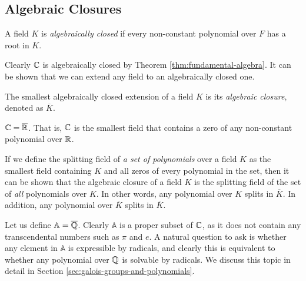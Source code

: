 \subsection{Algebraic Closures}
\begin{definition}
	A field $K$ is \textit{algebraically closed} if every non-constant polynomial over $F$ has a root in $K$. 
\end{definition}

Clearly $\mathbb C$ is algebraically closed by Theorem \ref{thm:fundamental-algebra}. It can be shown that we can extend any field to an algebraically closed one. 

\begin{definition}
	The smallest algebraically closed extension of a field $K$ is its \textit{algebraic closure}, denoted as $\overline K$.
\end{definition}

\begin{example}
	$\mathbb C  = \overline {\mathbb R}$. That is, $\mathbb C$ is the smallest field that contains a zero of any non-constant polynomial over $\mathbb R$.
\end{example}


If we define the splitting field of \textit{a set of polynomials} over a field $K$ as the smallest field containing $K$ and all zeros of every polynomial in the set, then it can be shown that the algebraic closure of a field $K$ is the splitting field of the set of \textit{all} polynomials over $K$. In other words, any polynomial over $K$ splits in $\overline K$. In addition, any polynomial over $\overline K$ splits in $\overline K$.

Let us define $\mathbb A = \overline {\mathbb Q}$. Clearly $\mathbb A$ is a proper subset of $\mathbb C$, as it does not contain any transcendental numbers such as $\pi$ and $e$. A natural question to ask is whether any element in $\mathbb A$ is expressible by radicals, and clearly this is equivalent to whether any polynomial over $\mathbb Q$ is solvable by radicals. We discuss this topic in detail in Section \ref{sec:galois-groups-and-polynomials}. 

%
%

